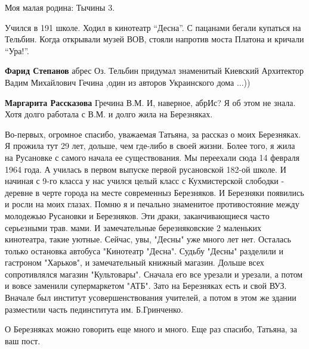 \begin{itemize}

Моя малая родина: Тычины 3.

Учился в 191 школе. Ходил в кинотеатр \enquote{Десна}. С пацанами бегали купаться на
Тельбин. Когда открывали музей ВОВ, стояли напротив моста Платона и кричали
\enquote{Ура!}.

\begin{itemize} %
\textbf{Фарид Степанов} абрес Оз. Тельбин придумал знаменитый Киевский Архитектор Вадим Михайлович Гечина ,один из авторов Украинского дома ...))

\textbf{Маргарита Рассказова} Гречина В.М. И, наверное, абрИс? Я об этом не знала. Хотя долго работала с В.М. и долго жила на Березняках.
\end{itemize} %


Во-первых, огромное спасибо, уважаемая Татьяна, за рассказ о моих Березняках. Я
прожила тут 29 лет, дольше, чем где-либо в своей жизни. Более того, я жила на
Русановке с самого начала ее существования. Мы переехали сюда 14 февраля 1964
года. А училась в первом выпуске первой русановской 182-ой школе. И начиная с
9-го класса у нас учился целый класс с Кухмистерской слободки - деревне в черте
города на месте современныз Березняков. И Березняки появились и росли на моих
глазах. Помню я и печально знаменитое противостояние между молодежью Русановки
и Березняков. Эти драки, заканчивающиеся часто серьезными трав. мами.  И
замечательные березняковские 2 маленьких кинотеатра, такие уютные. Сейчас, увы,
"Десны" уже много лет нет. Осталась только остановка автобуса "Кинотеатр
"Десна". Судьбу "Десны" разделили и гастроном "Харьков", и замечательный
книжный магазин. Дольше всех сопротивлялся магазин "Культовары". Сначала его
все урезали и урезали, а потом и вовсе заменили супермаркетом "АТБ". Зато на
Березняках есть и свой ВУЗ. Вначале был институт усовершенствования учителей, а
потом в этом же здании разместили часть пединститута им. Б.Гринченко.

О Березняках можно говорить еще много и много. Еще раз спасибо, Татьяна, за ваш
пост.

\end{itemize} %
